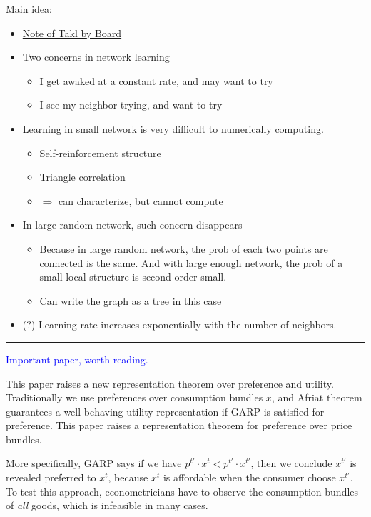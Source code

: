 \documentclass{book}
\theoremstyle{plain}
\theoremstyle{definition}
\begin{document}
\noindent
Main idea: 
\begin{itemize}
	\item \href{run:resources/learning/Talk_note_Learning in network.pdf}{Note of Takl by Board}
	\item Two concerns in network learning
	\begin{itemize}
		\item I get awaked at a constant rate, and may want to try
		\item I see my neighbor trying, and want to try
	\end{itemize}
	\item Learning in small network is very difficult to numerically computing.
	\begin{itemize}
		\item Self-reinforcement structure
		\item Triangle correlation
		\item $\Rightarrow$ can characterize, but cannot compute
	\end{itemize}
	\item In large random network, such concern disappears
	\begin{itemize}
		\item Because in large random network, the prob of each two points are connected is the same.
		And with large enough network, the prob of a small local structure is second order small. 
		\item Can write the graph as a tree in this case
	\end{itemize}
	\item (?) Learning rate increases exponentially with the number of neighbors.
\end{itemize}




\vspace{3mm}
\hrule
\vspace{3mm}

\noindent
\textbf{}

\textcolor{blue}{Important paper, worth reading.}

This paper raises a new representation theorem over preference and utility. 
Traditionally we use preferences over consumption bundles $x$, 
and Afriat theorem guarantees a well-behaving utility representation if GARP is satisfied for preference.
This paper raises a representation theorem for preference over price bundles.

More specifically, GARP says if we have $p^{t'}\cdot x^t<p^{t'}\cdot x^{t'}$,
then we conclude $x^{t'}$ is revealed preferred to $x^t$, because $x^t$ is affordable when the consumer choose $x^{t'}$.
To test this approach, econometricians have to observe the consumption bundles of \textit{all} goods, which is infeasible in many cases.
\end{document}
